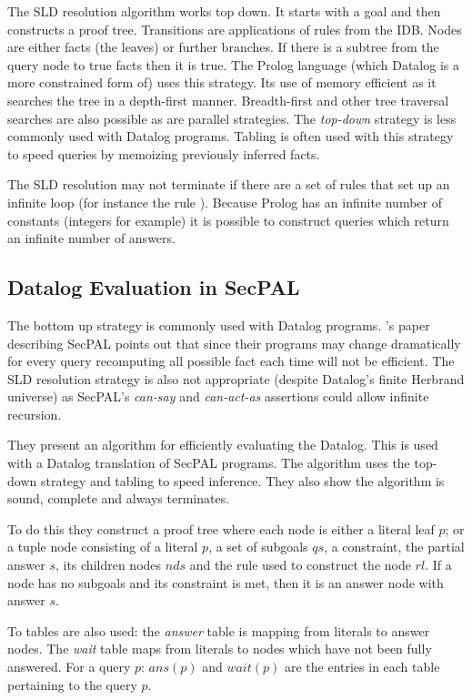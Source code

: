 \documentclass[a4paper,sfsidenotes]{tufte-book}
\begin{document}
The \ac{SLD} resolution algorithm works top down. It starts with a goal and then
constructs a proof tree. Transitions are applications of rules from the
\ac{IDB}. Nodes are either facts (the leaves) or further branches.  If there is
a subtree from the query node to true facts then it is true.  The Prolog
language (which Datalog is a more constrained form of) uses this strategy.  Its
use of memory efficient as it searches the tree in a depth-first manner.
Breadth-first and other tree traversal searches are also possible as are
parallel strategies.  The \emph{top-down} strategy is less commonly used with
Datalog programs. Tabling is often used with this strategy to speed queries by
memoizing previously inferred facts.

The \ac{SLD} resolution may
not terminate if there are a set of rules that set up an infinite loop (for
instance the rule ).
Because Prolog has an infinite number of constants
(integers for example) it is possible to construct queries which return an infinite
number of answers.

\subsection{Datalog Evaluation in SecPAL}

The bottom up strategy is commonly used with Datalog programs.
\citeauthor*{Becker:2009vt}'s paper describing SecPAL\cite{Becker:2010vh} points out that since
their programs may change dramatically for every query recomputing all
possible fact each time  will not be efficient. The
\ac{SLD} resolution strategy is also not appropriate (despite Datalog's finite
Herbrand universe) as SecPAL's \emph{can-say} and \emph{can-act-as} assertions
could
allow infinite recursion.

They present an algorithm for efficiently evaluating the Datalog. This is used
with a Datalog translation of
SecPAL programs.  The algorithm uses the top-down strategy and tabling to speed
inference. They also show the algorithm is sound, complete and always
terminates. 

To do this they construct a proof tree where each node is either a literal leaf
$p$; or a tuple node consisting of a literal $p$, a set of subgoals $qs$, a
constraint, the partial answer $s$, its children nodes $nds$ and the rule used
to construct the node $rl$.  If a node has no subgoals and its constraint
is met, then it is an answer node with answer $s$.

To tables are also used: the \emph{answer} table is mapping from literals to
answer nodes.  The \emph{wait} table maps from literals to nodes which
have not been fully answered.  For a query $p$: $ans(p)$ and $wait(p)$ are the
entries in each table pertaining to the query $p$.
\end{document}
